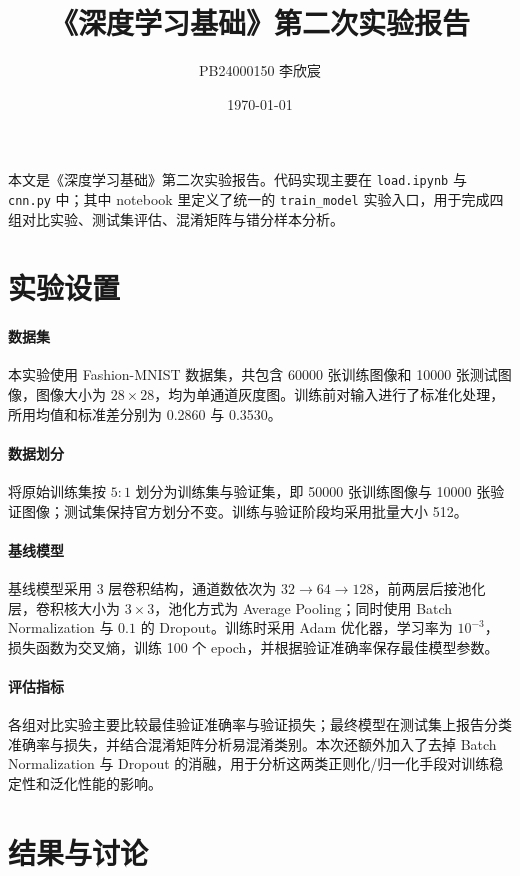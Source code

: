 \documentclass{ctexart}
\title{《深度学习基础》第二次实验报告}
\author{PB24000150 李欣宸}
\date{\today}
\begin{document}
\maketitle

本文是《深度学习基础》第二次实验报告。代码实现主要在 \verb|load.ipynb| 与 \verb|cnn.py| 中；其中 notebook 里定义了统一的 \verb|train_model| 实验入口，用于完成四组对比实验、测试集评估、混淆矩阵与错分样本分析。

\section{实验设置}

\paragraph{数据集}
本实验使用 Fashion-MNIST 数据集，共包含 60000 张训练图像和 10000 张测试图像，图像大小为 $28 \times 28$，均为单通道灰度图。训练前对输入进行了标准化处理，所用均值和标准差分别为 0.2860 与 0.3530。

\paragraph{数据划分}
将原始训练集按 $5:1$ 划分为训练集与验证集，即 50000 张训练图像与 10000 张验证图像；测试集保持官方划分不变。训练与验证阶段均采用批量大小 512。

\paragraph{基线模型}
基线模型采用 3 层卷积结构，通道数依次为 $32 \rightarrow 64 \rightarrow 128$，前两层后接池化层，卷积核大小为 $3 \times 3$，池化方式为 Average Pooling；同时使用 Batch Normalization 与 $0.1$ 的 Dropout。训练时采用 Adam 优化器，学习率为 $10^{-3}$，损失函数为交叉熵，训练 100 个 epoch，并根据验证准确率保存最佳模型参数。

\paragraph{评估指标}
各组对比实验主要比较最佳验证准确率与验证损失；最终模型在测试集上报告分类准确率与损失，并结合混淆矩阵分析易混淆类别。本次还额外加入了去掉 Batch Normalization 与 Dropout 的消融，用于分析这两类正则化/归一化手段对训练稳定性和泛化性能的影响。

\section{结果与讨论}
\end{document}

